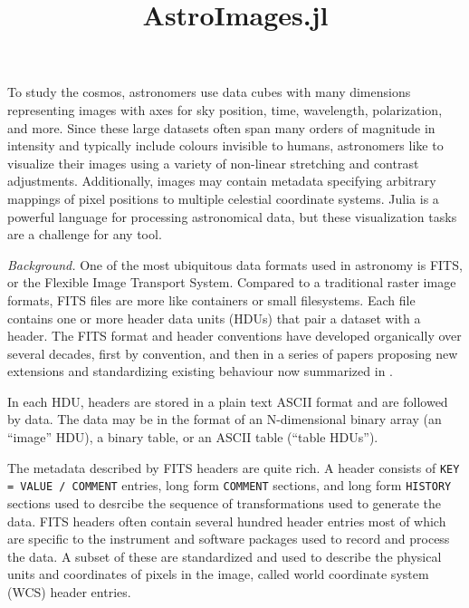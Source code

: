 \documentclass{juliacon}
\begin{document}



\title{AstroImages.jl}

\maketitle

To study the cosmos, astronomers use data cubes with many dimensions representing images with axes for sky position, time, wavelength, polarization, and more. Since these large datasets often span many orders of magnitude in intensity and typically include colours invisible to humans, astronomers like to visualize their images using a variety of non-linear stretching and contrast adjustments.
Additionally, images may contain metadata specifying arbitrary mappings of pixel positions to multiple celestial coordinate systems.
Julia\cite{bezanson2017julia} is a powerful language for processing astronomical data, but these visualization tasks are a challenge for any tool.

\vspace{0.2cm}
\emph{Background.}
One of the most ubiquitous data formats used in astronomy is FITS, or the Flexible Image Transport System.
Compared to a traditional raster image formats, FITS files are more like containers or small filesystems.
Each file contains one or more header data units (HDUs) that pair a dataset with a header.
The FITS format and header conventions have developed organically over several decades, first by convention,
and then in a series of papers proposing new extensions and standardizing existing behaviour now summarized in \cite{fitsstandard}.

In each HDU,
headers are stored in a plain text ASCII format and are followed by data.
The data may be in the format of an N-dimensional binary array (an ``image'' HDU),
a binary table,
or an ASCII table (``table HDUs'').

The metadata described by FITS headers are quite rich.
A header consists of \verb|KEY = VALUE / COMMENT| entries, long form \verb|COMMENT| sections,
and long form \verb|HISTORY| sections used to desrcibe the sequence of transformations used to generate the data.
FITS headers often contain several hundred header entries most of which are specific to the instrument and software packages used to record and process the data.
A subset of these are standardized and used to describe the physical units and coordinates of pixels in the image, called world coordinate system (WCS) header entries.
\end{document}
